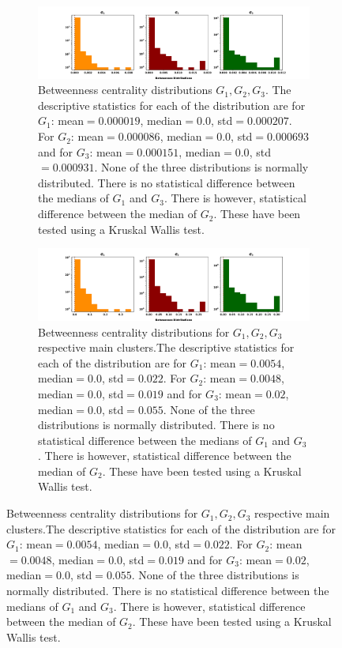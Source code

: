 \documentclass{article}
\theoremstyle{definition}
\begin{document}
\begin{figure}[!hbtp]
    \centering
    \begin{subfigure}{\textwidth}\centering
        \includegraphics[width=\textwidth]{./assets/images/betweeness_distributions.pdf}
        \caption{Betweenness centrality distributions \(G_1, G_2, G_3\). The descriptive
        statistics for each of the distribution are for \(G_1\): mean\(=0.000019\),
        median\(=0.0\), std\(=0.000207\). For \(G_2\): mean\(=0.000086\), median\(=0.0\),
        std\(=0.000693\) and for \(G_3\): mean\(=0.000151\), median\(=0.0\), std\(=0.000931\).
        None of the three distributions is normally distributed. There is no
        statistical difference between the medians of \(G_1\) and \(G_3\). There
        is however, statistical difference between the median of \(G_2\).
        These have been tested using a Kruskal Wallis test.}\label{fig:betweenness_dist}
    \end{subfigure}
    \begin{subfigure}{\textwidth}\centering
        \includegraphics[width=\textwidth]{./assets/images/betweeness_distributions_clusters.pdf}
        \caption{Betweenness centrality distributions for \(G_1, G_2, G_3\) respective
        main clusters.The descriptive
        statistics for each of the distribution are for \(G_1\): mean\(=0.0054\),
        median\(=0.0\), std\(=0.022\). For \(G_2\): mean\(=0.0048\), median\(=0.0\),
        std\(=0.019\) and for \(G_3\): mean\(=0.02\), median\(=0.0\), std\(=0.055\).
        None of the three distributions is normally distributed. There is no
        statistical difference between the medians of \(G_1\) and \(G_3\). There
        is however, statistical difference between the median of \(G_2\).
        These have been tested using a Kruskal Wallis test.}\label{fig:betweenness_dist_cluster}
    \end{subfigure}%
\end{figure}
 
\end{document}
